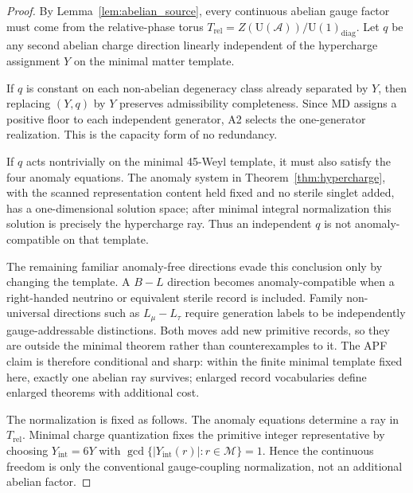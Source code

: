 \documentclass[11pt]{article}
\theoremstyle{definition}
\begin{document}
\begin{proof}
By Lemma~\ref{lem:abelian_source}, every continuous abelian gauge factor must
come from the relative-phase torus
$T_{\mathrm{rel}}=Z(\mathrm U(\mathcal A))/\mathrm U(1)_{\mathrm{diag}}$.
Let $q$ be any second abelian charge direction linearly independent of the
hypercharge assignment $Y$ on the minimal matter template.

If $q$ is constant on each non-abelian degeneracy class already separated by
$Y$, then replacing $(Y,q)$ by $Y$ preserves admissibility completeness.  Since
MD assigns a positive floor to each independent generator, A2 selects the
one-generator realization.  This is the capacity form of no redundancy.

If $q$ acts nontrivially on the minimal 45-Weyl template, it must also satisfy
the four anomaly equations.  The anomaly system in
Theorem~\ref{thm:hypercharge}, with the scanned representation content held
fixed and no sterile singlet added, has a one-dimensional solution space; after
minimal integral normalization this solution is precisely the hypercharge ray.
Thus an independent $q$ is not anomaly-compatible on that template.

The remaining familiar anomaly-free directions evade this conclusion only by
changing the template.  A $B-L$ direction becomes anomaly-compatible when a
right-handed neutrino or equivalent sterile record is included.  Family
non-universal directions such as $L_\mu-L_\tau$ require generation labels to
be independently gauge-addressable distinctions.  Both moves add new primitive
records, so they are outside the minimal theorem rather than counterexamples to
it.  The APF claim is therefore conditional and sharp: within the finite
minimal template fixed here, exactly one abelian ray survives; enlarged
record vocabularies define enlarged theorems with additional cost.

The normalization is fixed as follows.  The anomaly equations determine a ray
in $T_{\mathrm{rel}}$.  Minimal charge quantization fixes the primitive
integer representative by choosing $Y_{\mathrm{int}}=6Y$ with
$\gcd\{|Y_{\mathrm{int}}(r)|:r\in\mathcal M\}=1$.  Hence the continuous
freedom is only the conventional gauge-coupling normalization, not an
additional abelian factor.
\end{proof}
\end{document}
